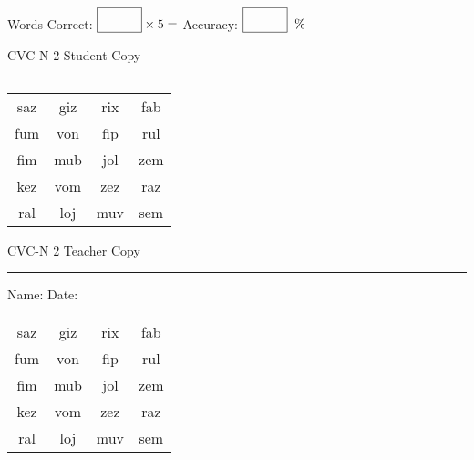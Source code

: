 \documentclass{memoir}
\begin{document}
\small

Words Correct: $\fbox{\phantom{\huge 100}} \times 5 = $ Accuracy: $\fbox{\phantom{\huge 100}}\;\; \%$ 

\vfill

\newpage


\footnotesize \noindent
CVC-N 2 \hfill Student Copy
\smallskip
\hrule

\Large

\setlength{\tabcolsep}{14pt}
\def\arraystretch{2}

{\selectfont


\begin{vplace}[0.5]
\begin{center}
\begin{tabular}{cccc}
saz & giz & rix & fab \\
fum & von & fip & rul \\
fim & mub & jol & zem \\
kez & vom & zez & raz \\
ral & loj & muv & sem \\
\end{tabular}
\end{center}
\end{vplace}

}

\newpage

\footnotesize \noindent
CVC-N 2 \hfill Teacher Copy
\smallskip
\hrule

\small

\vfill

\noindent
Name: \underline{\hspace{1.75in}} \hfill Date: \underline{\hspace{1in}}

\Large

{\selectfont


\begin{vplace}[0.5]
\begin{center}
\begin{tabular}{cccc}
saz & giz & rix & fab \\
fum & von & fip & rul \\
fim & mub & jol & zem \\
kez & vom & zez & raz \\
ral & loj & muv & sem \\
\end{tabular}
\end{center}
\end{vplace}



}
\end{document}
